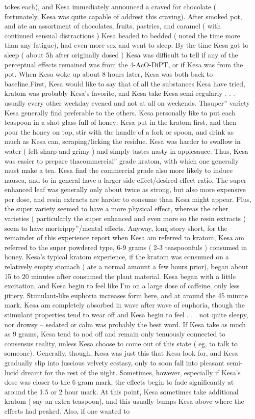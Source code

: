 \documentclass[12pt]{book}
\begin{document}
tokes each), and Kesa immediately announced a craved for chocolate ( fortunately, Kesa was quite capable of addrest this craving). After smoked pot, and ate an assortment of chocolates, fruits, pastries, and caramel ( with continued sensual distractions ) Kesa headed to bedded ( noted the time more than any fatigue), had even more sex and went to sleep. By the time Kesa got to sleep ( about 5h after originally dosed ) Kesa was difficult to tell if any of the perceptual effects remained was from the 4-AcO-DiPT, or if Kesa was from the pot. When Kesa woke up about 8 hours later, Kesa was both back to baseline.First, Kesa would like to say that of all the substances Kesa have tried, kratom was probably Kesa's favorite, and Kesa take Kesa semi-regularly . . .  usually every other weekday evened and not at all on weekends. Thsuper'' variety Kesa generally find preferable to the others. Kesa personally like to put each teaspoon in a shot glass full of honey: Kesa put in the kratom first, and then pour the honey on top, stir with the handle of a fork or spoon, and drink as much as Kesa can, scraping/licking the residue. Kesa was harder to swallow in water ( felt sharp and grimy ) and simply tastes nasty in applesauce. Thus, Kesa was easier to prepare thacommercial'' grade kratom, with which one generally must make a tea. Kesa find the commercial grade also more likely to induce nausea, and to in general have a larger side-effect/desired-effect ratio. The super enhanced leaf was generally only about twice as strong, but also more expensive per dose, and resin extracts are harder to consume than Kesa might appear. Plus, the super variety seemed to have a more physical effect, whereas the other varieties ( particularly the super enhanced and even more so the resin extracts ) seem to have mortrippy''/mental effects. Anyway, long story short, for the remainder of this experience report when Kesa am referred to kratom, Kesa am referred to the super powdered type, 6-9 grams ( 2-3 teaspoonfuls ) consumed in honey. Kesa's typical kratom experience, if the kratom was consumed on a relatively empty stomach ( ate a normal amount a few hours prior), began about 15 to 20 minutes after consumed the plant material. Kesa began with a little excitation, and Kesa begin to feel like I'm on a large dose of caffeine, only less jittery. Stimulant-like euphoria increases form here, and at around the 45 minute mark, Kesa am completely absorbed in wave after wave of euphoria, though the stimulant properties tend to wear off and Kesa begin to feel . . .  not quite sleepy, nor drowsy -- sedated or calm was probably the best word. If Kesa take as much as 9 grams, Kesa tend to nod off and remain only tenuously connected to consensus reality, unless Kesa choose to come out of this state ( eg, to talk to someone). Generally, though, Kesa was just this that Kesa look for, and Kesa gradually slip into luscious velvety ecstasy, only to soon fall into pleasant semi-lucid dreamt for the rest of the night. Sometimes, however, especially if Kesa's dose was closer to the 6 gram mark, the effects begin to fade significantly at around the 1.5 or 2 hour mark. At this point, Kesa sometimes take additional kratom ( say an extra teaspoon), and this usually bumps Kesa above where the effects had peaked. Also, if one wanted to 
\end{document}
